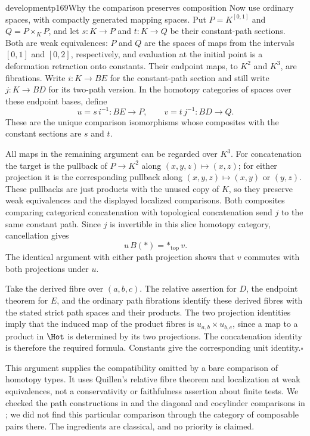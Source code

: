 \begin{dcomment}{development}{p169}{Why the comparison preserves composition}
Now use ordinary spaces, with compactly generated mapping spaces. Put $P=K^{[0,1]}$ and $Q=P\times_K P$, and let $s:K\to P$ and $t:K\to Q$ be their constant-path sections. Both are weak equivalences: $P$ and $Q$ are the spaces of maps from the intervals $[0,1]$ and $[0,2]$, respectively, and evaluation at the initial point is a deformation retraction onto constants. Their endpoint maps, to $K^2$ and $K^3$, are fibrations. Write $i:K\to BE$ for the constant-path section and still write $j:K\to BD$ for its two-path version. In the homotopy categories of spaces over these endpoint bases, define
\[
 u=s\,i^{-1}:BE\longrightarrow P,
 \qquad
 v=t\,j^{-1}:BD\longrightarrow Q.
\]
These are the unique comparison isomorphisms whose composites with the constant sections are $s$ and $t$.

All maps in the remaining argument can be regarded over $K^3$. For concatenation the target is the pullback of $P\to K^2$ along $(x,y,z)\mapsto(x,z)$; for either projection it is the corresponding pullback along $(x,y,z)\mapsto(x,y)$ or $(y,z)$. These pullbacks are just products with the unused copy of $K$, so they preserve weak equivalences and the displayed localized comparisons. Both composites comparing categorical concatenation with topological concatenation send $j$ to the same constant path. Since $j$ is invertible in this slice homotopy category, cancellation gives
\[
                u\,B(\mathord{*})=\mathord{*}_{\mathrm{top}}\,v.
\]
The identical argument with either path projection shows that $v$ commutes with both projections under $u$.

Take the derived fibre over $(a,b,c)$. The relative assertion for $D$, the endpoint theorem for $E$, and the ordinary path fibrations identify these derived fibres with the stated strict path spaces and their products. The two projection identities imply that the induced map of the product fibres is $u_{a,b}\times u_{b,c}$, since a map to a product in $\Hot$ is determined by its two projections. The concatenation identity is therefore the required formula. Constants give the corresponding unit identity.\hfill$\square$

This argument supplies the compatibility omitted by a bare comparison of homotopy types. It uses Quillen's relative fibre theorem and localization at weak equivalences, not a conservativity or faithfulness assertion about finite tests. We checked the path constructions in \citet[Section~I.1]{Evrard1975} and the diagonal and cocylinder comparisons in \citet[Sections~1.5 and~2.1, Theorem~2.8]{Shoikhet2016}; we did not find this particular comparison through the category of composable pairs there. The ingredients are classical, and no priority is claimed.
\end{dcomment}
